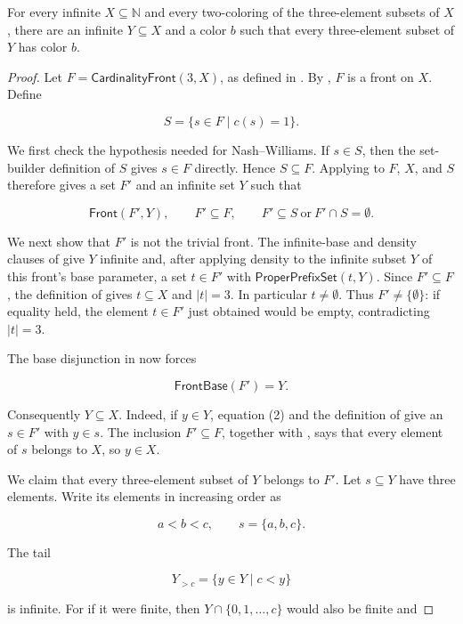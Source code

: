 \begin{lemma}
For every infinite $X\subseteq\mathbb N$ and every two-coloring of the
three-element subsets of $X$, there are an infinite $Y\subseteq X$ and a
color $b$ such that every three-element subset of $Y$ has color $b$.
\end{lemma}
\begin{proof}
Let $F=\mathsf{CardinalityFront}(3,X)$, as defined in
.  By
, $F$ is a front on $X$.  Define

\[
S=\{s\in F\mid c(s)=1\}.
\]

We first check the hypothesis needed for Nash--Williams.  If $s\in S$,
then the set-builder definition of $S$ gives $s\in F$ directly.  Hence
$S\subseteq F$.  Applying  to $F$, $X$, and $S$
therefore gives a set $F'$ and an infinite set $Y$ such that

\[
\mathsf{Front}(F',Y),\qquad F'\subseteq F,
\qquad F'\subseteq S\ \text{or}\ F'\cap S=\emptyset.
\tag{1}
\]

We next show that $F'$ is not the trivial front.  The infinite-base and
density clauses of  give $Y$ infinite and, after applying
density to the infinite subset $Y$ of this front's base parameter, a set
$t\in F'$ with $\mathsf{ProperPrefixSet}(t,Y)$.  Since $F'\subseteq F$,
the definition of  gives $t\subseteq X$ and
$|t|=3$.  In particular $t\ne\emptyset$.  Thus $F'\ne\{\emptyset\}$:
if equality held, the element $t\in F'$ just obtained would be empty,
contradicting $|t|=3$.

The base disjunction in  now forces

\[
\mathsf{FrontBase}(F')=Y.
\tag{2}
\]

Consequently $Y\subseteq X$.  Indeed, if $y\in Y$, equation (2) and
the definition of  give an $s\in F'$ with $y\in s$.
The inclusion $F'\subseteq F$, together with
, says that every element of $s$ belongs to
$X$, so $y\in X$.

We claim that every three-element subset of $Y$ belongs to $F'$.  Let
$s\subseteq Y$ have three elements.  Write its elements in increasing
order as

\[
a<b<c,\qquad s=\{a,b,c\}.
\]

The tail

\[
Y_{>c}=\{y\in Y\mid c<y\}
\]

is infinite.  For if it were finite, then
$Y\cap\{0,1,\ldots,c\}$ would also be finite and


\end{proof}
